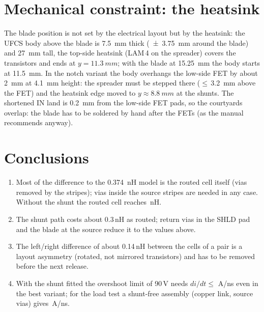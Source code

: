 \documentclass[11pt,a4paper]{article}
\begin{document}
\section{Mechanical constraint: the heatsink}
The blade position is not set by the electrical layout but by the heatsink: the UFCS body above the blade is
\SI{7.5}{mm} thick (\SI{\pm3.75}{mm} around the blade) and \SI{27}{mm} tall, the top-side heatsink (LAM\,4 on the
spreader) covers the transistors and ends at $y = \SI{11.3}{mm}$; with the blade at \SI{15.25}{mm} the body starts at
\SI{11.5}{mm}. In the notch variant the body overhangs the low-side FET by about \SI{2}{mm} at \SI{4.1}{mm} height:
the spreader must be stepped there ($\le$\,\SI{3.2}{mm} above the FET) and the heatsink edge moved to $y\approx\SI{8.8}{mm}$
at the shunts. The shortened IN land is \SI{0.2}{mm} from the low-side FET pads, so the courtyards overlap: the blade
has to be soldered by hand after the FETs (as the manual recommends anyway).

\section{Conclusions}
\begin{enumerate}
\item Most of the difference to the \SI{0.374}{nH} model is the routed cell itself (vias removed by the stripes);
vias inside the source stripes are needed in any case. Without the shunt the routed cell reaches \Lnoshunt\,nH.
\item The shunt path costs about 0.3\,nH as routed; return vias in the SHLD pad and the blade at the source reduce it to the
values above.
\item The left/right difference of about 0.14\,nH between the cells of a pair is a layout asymmetry (rotated, not
mirrored transistors) and has to be removed before the next release.
\item With the shunt fitted the overshoot limit of 90\,V needs $di/dt \le$\,\Dinotch\,A/ns even in the best variant;
for the load test a shunt-free assembly (copper link, source vias) gives \Dinoshunt\,A/ns.
\end{enumerate}
\end{document}
